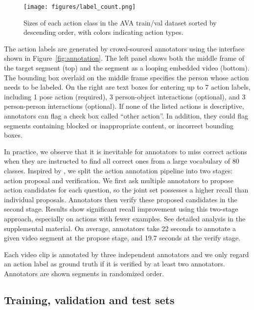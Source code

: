 \documentclass[10pt,twocolumn,letterpaper]{article}
\begin{document}
\begin{figure*}[tb!]
    \centering
    \texttt{[image: figures/label\_count.png]}
    \vspace{-1em}
    \caption{Sizes of each action class in the AVA train/val dataset sorted by descending order, with colors indicating action types.}
    \label{fig:label_counts_top}
    \vspace{-1em}
\end{figure*}

The action labels are generated by crowd-sourced annotators using the interface shown in {Figure~\ref{fig:annotation}}. The left panel shows both the middle frame of the target segment (top) and the segment as a looping embedded video (bottom). The bounding box overlaid on the middle frame specifies the person whose action needs to be labeled. On the right are text boxes for entering up to 7 action labels, including 1 pose action (required), 3 person-object interactions (optional), and 3 person-person interactions (optional). If none of the listed actions is descriptive, annotators can flag a check box called ``other action''. In addition, they could flag segments containing blocked or inappropriate content, or incorrect bounding boxes. 

In practice, we observe that it is inevitable for annotators to miss correct actions when they are instructed to find all correct ones from a large vocabulary of 80 classes. Inspired by \cite{Sigurdsson_HCOMP2016}, we split the action annotation pipeline into two stages: action proposal and verification. We first ask multiple annotators to propose action candidates for each question, so the joint set possesses a higher recall than individual proposals. Annotators then verify these proposed candidates in the second stage. Results show significant recall improvement using this two-stage approach, especially on actions with fewer examples. See detailed analysis in the supplemental material. On average, annotators take 22 seconds to annotate a given video segment at the propose stage, and 19.7 seconds at the verify stage.  

Each video clip is annotated by three independent annotators and we only regard an action label as ground truth if it is verified by at least two annotators. Annotators are shown segments in randomized order.

\subsection{Training, validation and test sets}
\end{document}
